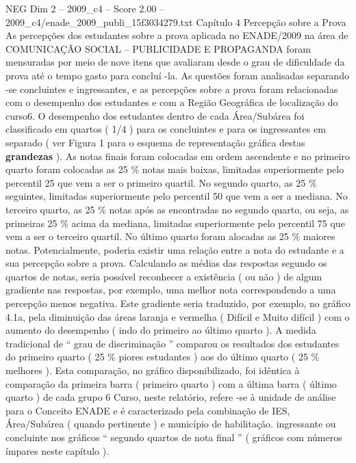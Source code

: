 \begin{textsample}{NEG Dim 2 – 2009\_c4 – Score 2.00 – 2009\_c4/enade\_2009\_publi\_15f3034279.txt}  \label{ex:f2_neg_235}
Capítulo 4 Percepção sobre a Prova As percepções dos estudantes sobre a prova aplicada no ENADE/2009 na área de COMUNICAÇÃO SOCIAL – PUBLICIDADE E PROPAGANDA foram mensuradas por meio de nove itens que avaliaram desde o grau de dificuldade da prova até o tempo gasto para concluí -la.
As questões foram analisadas separando -se concluintes e ingressantes, e as percepções sobre a prova foram relacionadas com o desempenho dos estudantes e com a Região Geográfica de localização do curso6.
O desempenho dos estudantes dentro de cada Área/Subárea foi classificado em quartos ( 1/4 ) para os concluintes e para os ingressantes em separado ( ver Figura 1 para o esquema de representação gráfica destas \textbf{grandezas} ).
As notas finais foram colocadas em ordem ascendente e no primeiro quarto foram colocadas as 25 \% notas mais baixas, limitadas superiormente pelo percentil 25 que vem a ser o primeiro quartil.
No segundo quarto, as 25 \% seguintes, limitadas superiormente pelo percentil 50 que vem a ser a mediana.
No terceiro quarto, as 25 \% notas após as encontradas no segundo quarto, ou seja, as primeiras 25 \% acima da mediana, limitadas superiormente pelo percentil 75 que vem a ser o terceiro quartil.
No último quarto foram alocadas as 25 \% maiores notas.
Potencialmente, poderia existir uma relação entre a nota do estudante e a sua percepção sobre a prova.
Calculando as médias das respostas segundo os quartos de notas, seria possível reconhecer a existência ( ou não ) de algum gradiente nas respostas, por exemplo, uma melhor nota correspondendo a uma percepção menos negativa.
Este gradiente seria traduzido, por exemplo, no gráfico 4.1a, pela diminuição das áreas laranja e vermelha ( Difícil e Muito difícil ) com o aumento do desempenho ( indo do primeiro ao último quarto ).
A medida tradicional de “ grau de discriminação ” comparou os resultados dos estudantes do primeiro quarto ( 25 \% piores estudantes ) aos do último quarto ( 25 \% melhores ).
Esta comparação, no gráfico disponibilizado, foi idêntica à comparação da primeira barra ( primeiro quarto ) com a última barra ( último quarto ) de cada grupo 6 Curso, neste relatório, refere -se à unidade de análise para o Conceito ENADE e é caracterizado pela combinação de IES, Área/Subárea ( quando pertinente ) e município de habilitação. ingressante ou concluinte nos gráficos “ segundo quartos de nota final ” ( gráficos com números ímpares neste capítulo ).

\end{textsample}
